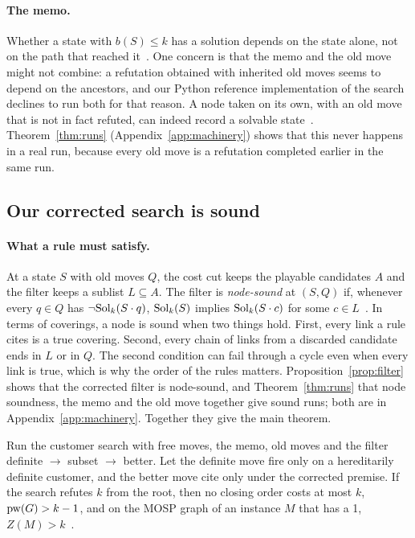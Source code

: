 \paragraph{The memo.} Whether a state with $b(S)\le k$ has a solution depends
on the state alone, not on the path that reached it~. One
concern is that the memo and the old move might not combine: a refutation
obtained with inherited old moves seems to depend on the ancestors, and our Python reference implementation of the search declines to run both for that reason. A node
taken on its own, with an old move that is not in fact refuted, can indeed
record a solvable state~. Theorem~\ref{thm:runs}
(Appendix~\ref{app:machinery}) shows that this never happens in a real run,
because every old move is a refutation completed earlier in the same run.

\subsection{Our corrected search is sound}
\label{sec:theorem}

\paragraph{What a rule must satisfy.} At a state $S$ with old moves $Q$, the
cost cut keeps the playable candidates $A$ and the filter keeps a sublist
$L\subseteq A$. The filter is \emph{node-sound} at $(S,Q)$ if, whenever every
$q\in Q$ has $\neg\mathrm{Sol}_k(S\cdot q)$, $\mathrm{Sol}_k(S)$ implies $\mathrm{Sol}_k(S\cdot c)$ for
some $c\in L$~. In terms of coverings, a node is sound when
two things hold. First, every link a rule cites is a true covering. Second,
every chain of links from a discarded candidate ends in $L$ or in $Q$. The
second condition can fail through a cycle even when every link is true, which
is why the order of the rules matters. Proposition~\ref{prop:filter} shows that
the corrected filter is node-sound, and Theorem~\ref{thm:runs} that node
soundness, the memo and the old move together give sound runs; both are in
Appendix~\ref{app:machinery}. Together they give the main theorem.

\begin{theorem}\label{thm:main}
Run the customer search with free moves, the memo, old moves and the filter
definite $\to$ subset $\to$ better. Let the definite move fire only on a
hereditarily definite customer, and the better move cite only under the
corrected premise. If the search refutes $k$ from the root, then no closing order costs
at most $k$, $\mathrm{pw}(G)>k-1$, and on the MOSP graph of an instance $M$ that has a 1,
$Z(M)>k$~.
\end{theorem}

